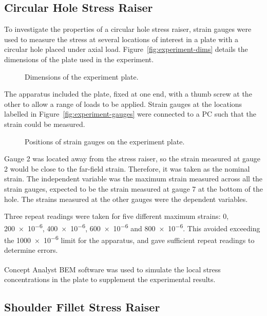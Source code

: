 \documentclass[a4paper,11pt,twocolumn]{article}
\newcommand{\BEM}{\textsc{BEM}\xspace}
\begin{document}
\subsection{Circular Hole Stress Raiser}

To investigate the properties of a circular hole stress raiser, strain gauges
were used to measure the stress at several locations of interest in a plate 
with a circular hole placed under axial load. Figure~\vref{fig:experiment-dims} 
details the dimensions of the plate used in the experiment.

\begin{figure}[h]
    \centering
    \def\svgwidth{\linewidth}
    
    \caption{Dimensions of the experiment plate.}
    \label{fig:experiment-dims}
\end{figure}

The apparatus included the plate, fixed at one end, with a thumb screw at the 
other to allow a range of loads to be applied. Strain gauges at the 
locations labelled in Figure~\vref{fig:experiment-gauges} were connected to a 
\textsc{PC} such that the strain could be measured.

\begin{figure}[h]
    \centering
    \def\svgwidth{\linewidth}
    
    \caption{Positions of strain gauges on the experiment plate.}
    \label{fig:experiment-gauges}
\end{figure}

Gauge 2 was located away from the stress raiser, so the strain measured at gauge
2 would be close to the far-field strain. Therefore, it was taken as the nominal
strain. The independent variable was the maximum strain measured across all the
strain gauges, expected to be the strain measured at gauge 7 at the bottom of
the hole. The strains measured at the other gauges were the dependent variables.

Three repeat readings were taken for five different maximum strains: 0, 
\num{200e-6}, \num{400e-6}, \num{600e-6} and \num{800e-6}. This avoided
exceeding the \num{1000e-6} limit for the apparatus, and gave sufficient repeat
readings to determine errors.

Concept Analyst\textsuperscript{\textregistered} \BEM software was used to
simulate the local stress concentrations in the plate to supplement the
experimental results.

\subsection{Shoulder Fillet Stress Raiser}
\end{document}
